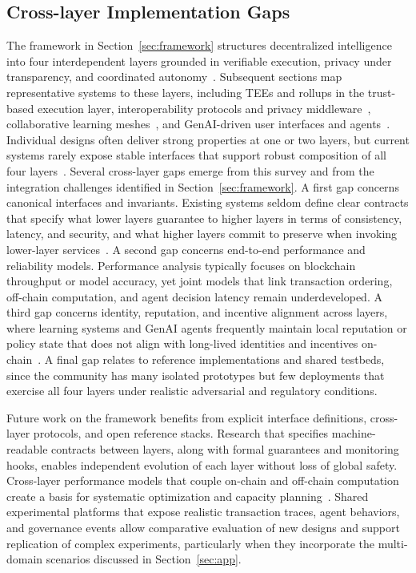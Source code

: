 \documentclass[5p,twocolumn]{elsarticle}
\begin{document}
\subsection{Cross-layer Implementation Gaps}
The framework in Section~\ref{sec:framework} structures decentralized intelligence into four interdependent layers grounded in verifiable execution, privacy under transparency, and coordinated autonomy~\cite{xu2024survey,savadatti2025survey,wang2024sok}. Subsequent sections map representative systems to these layers, including TEEs and rollups in the trust-based execution layer, interoperability protocols and privacy middleware~\cite{huang2023overview,wan2024web3}, collaborative learning meshes~\cite{luo2024survey,javadpour2024decentralized}, and GenAI-driven user interfaces and agents~\cite{huang2024large}. Individual designs often deliver strong properties at one or two layers, but current systems rarely expose stable interfaces that support robust composition of all four layers~\cite{liu2024blockchainempowered}. Several cross-layer gaps emerge from this survey and from the integration challenges identified in Section~\ref{sec:framework}. A first gap concerns canonical interfaces and invariants. Existing systems seldom define clear contracts that specify what lower layers guarantee to higher layers in terms of consistency, latency, and security, and what higher layers commit to preserve when invoking lower-layer services~\cite{wan2024web3}. A second gap concerns end-to-end performance and reliability models. Performance analysis typically focuses on blockchain throughput or model accuracy, yet joint models that link transaction ordering, off-chain computation, and agent decision latency remain underdeveloped. A third gap concerns identity, reputation, and incentive alignment across layers, where learning systems and GenAI agents frequently maintain local reputation or policy state that does not align with long-lived identities and incentives on-chain~\cite{dorri2018multi}. A final gap relates to reference implementations and shared testbeds, since the community has many isolated prototypes but few deployments that exercise all four layers under realistic adversarial and regulatory conditions.

Future work on the framework benefits from explicit interface definitions, cross-layer protocols, and open reference stacks. Research that specifies machine-readable contracts between layers, along with formal guarantees and monitoring hooks, enables independent evolution of each layer without loss of global safety. Cross-layer performance models that couple on-chain and off-chain computation create a basis for systematic optimization and capacity planning~\cite{xu2024survey}. Shared experimental platforms that expose realistic transaction traces, agent behaviors, and governance events allow comparative evaluation of new designs and support replication of complex experiments, particularly when they incorporate the multi-domain scenarios discussed in Section~\ref{sec:app}.
\end{document}
